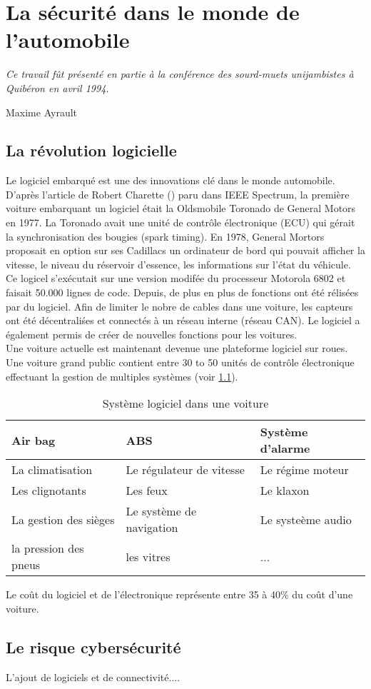 
\chapter{La s\'ecurit\'e dans le monde de l'automobile} \label{CHAP2}
\smallskip
\hfill
\begin{minipage}[b]{8cm}
{\it Ce travail f\^ut pr\'esent\'e en partie \`a la conf\'erence des sourd-muets unijambistes \`a Quib\'eron en avril 1994.}
\end{minipage}
\begin{flushright} Maxime Ayrault \end{flushright}
\vskip 2cm

\section {La r\'evolution logicielle}
\medskip
{\Huge L}e logiciel embarqu\'e est une des innovations cl\'e dans le monde automobile.
D'apr\`es l'article de Robert Charette (\cite{Cha09}) paru dans IEEE Spectrum, la premi\`ere voiture embarquant un logiciel \'etait la Oldsmobile Toronado de General Motors en 1977. La Toronado avait une unit\'e de contr\^ole \'electronique (ECU) qui g\'erait la synchronisation des bougies (spark timing). En 1978, General Mortors proposait en option sur ses Cadillacs un ordinateur de bord qui pouvait afficher la vitesse, le niveau du r\'eservoir d'essence, les informations sur l'\'etat du v\'ehicule. Ce logicel s'ex\'ecutait sur une version modif\'ee du processeur Motorola 6802 et faisait 50.000 lignes de code. Depuis, de plus en plus de fonctions ont \'et\'e r\'elis\'ees par du logiciel. Afin de limiter le nobre de cables dans une voiture, les capteurs ont \'et\'e d\'ecentrali\'ses et connect\'es \`a un r\'eseau interne (r\'eseau CAN). Le logiciel a \'egalement permis de cr\'eer de nouvelles fonctions pour les voitures. \\
Une voiture actuelle est maintenant devenue une plateforme logiciel sur roues. Une voiture grand public contient entre 30 to 50 unit\'es de contr\^ole \'electronique effectuant la gestion de multiples syst\`emes (voir \ref{tab:soft}).

\FloatBarrier
\begin{table}
\centering
\begin{tabular}{| l | l | l |}
\hline
Air bag & ABS & Syst\`eme d'alarme \\
\hline
La climatisation & Le r\'egulateur de vitesse & Le r\'egime moteur \\
\hline
Les clignotants & Les feux & Le klaxon \\
\hline
La gestion des si\`eges & Le syst\`eme de navigation & Le syste\`eme audio \\
\hline
la pression des pneus & les vitres & ... \\
\hline
\end{tabular}
\caption{Syst\`eme logiciel dans une voiture}
\label{tab:soft}
\end{table}
\FloatBarrier

Le co\^ut du logiciel et de l'\'electronique repr\'esente entre 35 \`a 40\% du co\^ut d'une voiture.



\section {Le risque cybers\'ecurit\'e}
 \medskip
 {\Huge L}'ajout de logiciels et de connectivit\'e....
